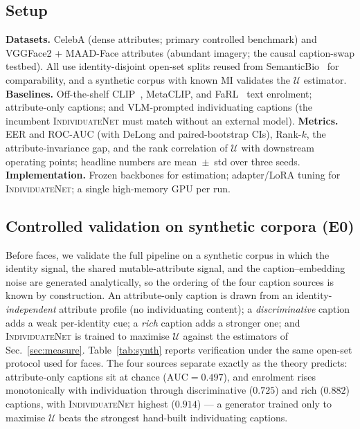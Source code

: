 \documentclass[10pt,twocolumn,letterpaper]{article}
\newcommand{\U}{\mathcal{U}}
\newcommand{\method}{\textsc{IndividuateNet}}
\begin{document}
\subsection{Setup}
\label{sec:exp-setup}
\textbf{Datasets.} CelebA (dense attributes; primary controlled benchmark) and VGGFace2 +
MAAD-Face attributes (abundant imagery; the causal caption-swap testbed). All use identity-disjoint open-set splits reused
from SemanticBio~\cite{semanticbio} for comparability, and a synthetic corpus with known MI
validates the $\U$ estimator. \textbf{Baselines.} Off-the-shelf CLIP~\cite{clip}, MetaCLIP, and
FaRL~\cite{farl} text enrolment; attribute-only captions; and VLM-prompted individuating
captions (the incumbent \method{} must match without an external model). \textbf{Metrics.} EER
and ROC-AUC (with DeLong and paired-bootstrap CIs), Rank-$k$, the attribute-invariance gap, and
the rank correlation of $\U$ with downstream operating points; headline numbers are
mean~$\pm$~std over three seeds. \textbf{Implementation.} Frozen backbones for estimation;
adapter/LoRA tuning for \method{}; a single high-memory GPU per run.

\subsection{Controlled validation on synthetic corpora (E0)}
\label{sec:e0}
Before faces, we validate the full pipeline on a synthetic corpus in which the identity signal,
the shared mutable-attribute signal, and the caption--embedding noise are generated analytically,
so the ordering of the four caption sources is known by construction. An attribute-only caption
is drawn from an identity-\emph{independent} attribute profile (no individuating content); a
\emph{discriminative} caption adds a weak per-identity cue; a \emph{rich} caption adds a stronger
one; and \method{} is trained to maximise $\U$ against the estimators of
Sec.~\ref{sec:measure}. Table~\ref{tab:synth} reports verification under the same open-set
protocol used for faces. The four sources separate exactly as the theory predicts: attribute-only
captions sit at chance ($\mathrm{AUC}=0.497$), and enrolment rises monotonically with
individuation through discriminative ($0.725$) and rich ($0.882$) captions, with \method{}
highest ($0.914$) --- a generator trained only to maximise $\U$ beats the strongest hand-built
individuating captions.
\end{document}
